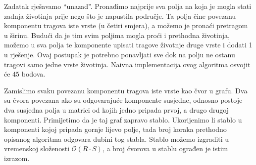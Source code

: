 \documentclass[a4paper]{article}
\begin{document}
Zadatak rješavamo ``unazad''. Pronađimo najprije sva polja na koja je mogla stati
zadnja životinja prije nego što je napustila područje. Ta polja čine povezanu
komponentu tragova iste vrste (u četiri smjera), a možemo je pronaći pretragom u
širinu. Budući da je tim svim poljima mogla proći i prethodna životinja, možemo
u sva polja te komponente upisati tragove životnje druge vrste i dodati 1 u rješenje.
Ovaj postupak je potrebno ponavljati sve dok na polju ne ostanu tragovi samo
jedne vrste životinja. Naivna implementacija ovog algoritma osvojit će $45$
bodova.

Zamislimo svaku povezanu komponentu tragova iste vrste kao čvor u grafu. Dva su
čvora povezana ako su odgovarajuće komponente susjedne, odnosno postoje dva
susjedna polja u matrici od kojih jedno pripada prvoj, a drugo drugoj komponenti.
Primijetimo da je taj graf zapravo stablo. Ukorijenimo li stablo u komponenti
kojoj pripada gornje lijevo polje, tada broj koraka prethodno opisanog algoritma
odgovara dubini tog stabla. Stablo možemo izgraditi u vremenskoj složenosti
$\mathcal{O}(R\cdot S)$, a broj čvorova u stablu ograđen je istim izrazom.
\end{document}
